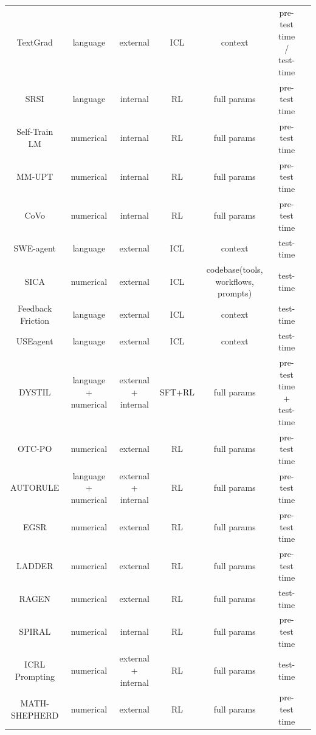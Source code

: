 \documentclass[10pt]{article} %
\begin{document}
\begin{table}[!t]
{\begin{tabular}{ccccccc}
TextGrad\citep{yellamraju2024textgrad} & language & external & ICL & context & pre-test time / test-time \\
SRSI\citep{simonds2025selfrewardingselfimproving} & language & internal & RL & full params & pre-test time \\
Self-Train LM\citep{shafayat2025largereasoningmodelsselftrain} & numerical & internal & RL & full params & pre-test time \\
MM-UPT\citep{wei2025unsupervisedposttrainingmultimodalllm} & numerical & internal & RL & full params & pre-test time \\
CoVo\citep{zhang2025consistentpathsleadtruth} & numerical & internal & RL & full params & pre-test time \\
SWE-agent\citep{du2025swedevevaluatingtrainingautonomous} & language & external & ICL & context & test-time \\
SICA\citep{robeyns2025self} & numerical & external & ICL & codebase(tools, workflows, prompts) & test-time \\
Feedback Friction\citep{jiang2025feedbackfriction} & language & external & ICL & context & test-time \\
USEagent\citep{applis2025useagent} & language & external & ICL & context & test-time \\
DYSTIL\citep{wang2025dystildynamicstrategyinduction} & language + numerical & external + internal & SFT+RL & full params & pre-test time + test-time \\
OTC-PO\citep{wang2025otcpo} & numerical & external & RL & full params & pre-test time \\
AUTORULE\citep{wang2025autorule} & language + numerical & external + internal & RL & full params & pre-test time \\
EGSR\citep{zhang2025learning} & numerical & external  & RL & full params & pre-test time \\
LADDER\citep{simonds2025ladder} & numerical & external  & RL & full params & pre-test time \\
RAGEN\citep{wang2025ragen} & numerical & external & RL & full params & test-time \\
SPIRAL\citep{liu2025spiral} & numerical & internal & RL & full params & pre-test time \\
ICRL Prompting\citep{song2025reward} & numerical & external + internal & RL & full params & test-time \\
MATH-SHEPHERD\citep{wang2023math} & numerical & external & RL & full params & pre-test time \\

\end{tabular}}
\end{table}
\end{document}
